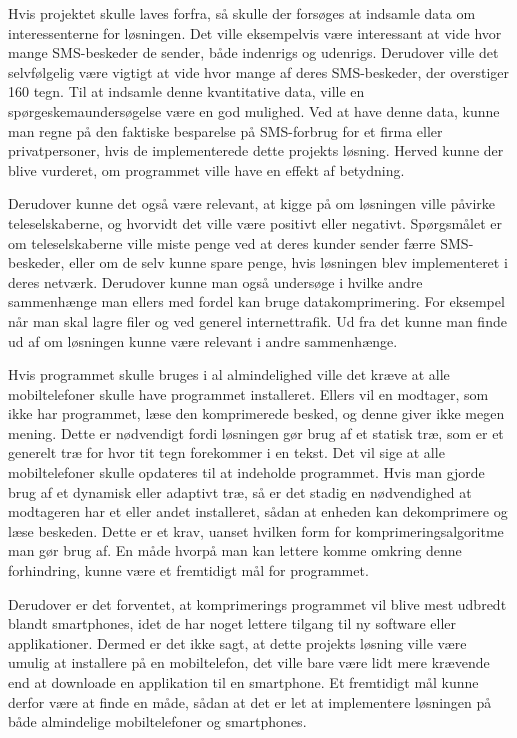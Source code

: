 Hvis projektet skulle laves forfra, så skulle der forsøges at indsamle data om interessenterne for løsningen. Det ville eksempelvis være interessant at vide hvor mange SMS-beskeder de sender, både indenrigs og udenrigs. Derudover ville det selvfølgelig være vigtigt at vide hvor mange af deres SMS-beskeder, der overstiger 160 tegn. Til at indsamle denne kvantitative data, ville en spørgeskemaundersøgelse være en god mulighed. Ved at have denne data, kunne man regne på den faktiske besparelse på SMS-forbrug for et firma eller privatpersoner, hvis de implementerede dette projekts løsning. Herved kunne der blive vurderet, om programmet ville have en effekt af betydning. 

Derudover kunne det også være relevant, at kigge på om løsningen ville påvirke teleselskaberne, og hvorvidt det ville være positivt eller negativt. Spørgsmålet er om teleselskaberne ville miste penge ved at deres kunder sender færre SMS-beskeder, eller om de selv kunne spare penge, hvis løsningen blev implementeret i deres netværk. Derudover kunne man også undersøge i hvilke andre sammenhænge man ellers med fordel kan bruge datakomprimering. For eksempel når man skal lagre filer og ved generel internettrafik. Ud fra det kunne man finde ud af om løsningen kunne være relevant i andre sammenhænge.

Hvis programmet skulle bruges i al almindelighed ville det kræve at alle mobiltelefoner skulle have programmet installeret. Ellers vil en modtager, som ikke har programmet, læse den komprimerede besked, og denne giver ikke megen mening. Dette er nødvendigt fordi løsningen gør brug af et statisk træ, som er et generelt træ for hvor tit tegn forekommer i en tekst. Det vil sige at alle mobiltelefoner skulle opdateres til at indeholde programmet. Hvis man gjorde brug af et dynamisk eller adaptivt træ, så er det stadig en nødvendighed at modtageren har et eller andet installeret, sådan at enheden kan dekomprimere og læse beskeden. Dette er et krav, uanset hvilken form for komprimeringsalgoritme man gør brug af. En måde hvorpå man kan lettere komme omkring denne forhindring, kunne være et fremtidigt mål for programmet.
 
Derudover er det forventet, at komprimerings programmet vil  blive mest udbredt blandt smartphones, idet de har noget lettere tilgang til ny software eller applikationer. Dermed er det ikke sagt, at dette projekts løsning ville være umulig at installere på en mobiltelefon, det ville bare være lidt mere krævende end at downloade en applikation til en smartphone. Et fremtidigt mål kunne derfor være at finde en måde, sådan at det er let at implementere løsningen på både almindelige mobiltelefoner og smartphones. 

